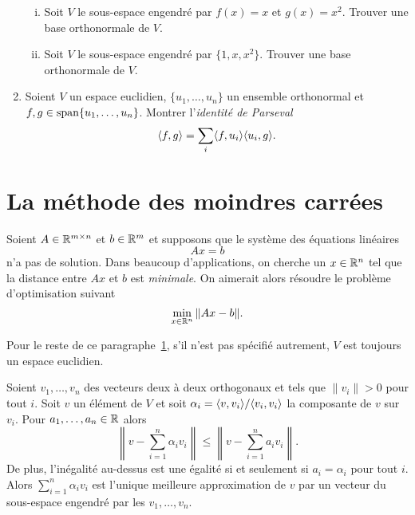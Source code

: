 \begin{enumerate}
\begin{enumerate}[i)]
  \item Soit $V$ le sous-espace engendré par $f(x) = x$ et $g(x) = x^2$. Trouver une base orthonormale de $V$. 
  \item Soit $V$ le sous-espace engendré par $\{1,x,x^2\}$. Trouver une base orthonormale de $V$. 
  \end{enumerate}
\item Soient $V$ un espace euclidien, $\{u_1,\dots,u_n\}$ un ensemble orthonormal et $f,g \in \operatorname{span}\{u_1,\dots,u_n\}$. Montrer l'\emph{identité de Parseval}
  \begin{displaymath}
    \langle {f,g} \rangle = \sum_i \langle {f,u_i} \rangle\langle {u_i,g} \rangle. 
  \end{displaymath}
\end{enumerate}


\section{La méthode des moindres carrées} 
\label{sec:le-methode-des}

Soient $A \in \mathbb{R}^{m \times n} $ et $b \in \mathbb{R}^m$ et supposons  que le système des équations linéaires 
\begin{equation}
  \label{eq:2}
  Ax = b
\end{equation}
n'a pas de solution. Dans beaucoup d'applications, on cherche un $x \in \mathbb{R}^n$ tel que la distance entre  $Ax$ et $b$ est \emph{minimale}. On aimerait alors résoudre le problème d'optimisation suivant
\begin{equation}
  \label{eq:3}
  \min_{x \in \mathbb{R}^n} \|Ax - b\|. 
\end{equation}

\begin{framed}\noindent 
  Pour le reste de ce paragraphe~\ref{sec:le-methode-des}, s'il n'est pas spécifié autrement, $V$ est toujours un espace euclidien.
\end{framed} 


\begin{theorem}
  \label{thr:3}
  Soient $v_1,\dots,v_n$ des vecteurs deux à deux orthogonaux et tels que $\|v_i\|>0$ pour tout $i$. Soit $v$ un élément de $V$ et soit $\alpha_i = \langle {v,v_i} \rangle/\langle {v_i,v_i} \rangle$ la composante de $v$ sur $v_i$. Pour $a_1,\dots,a_n \in \mathbb{R}$ alors 
  \begin{displaymath}
    \left\| v - \sum_{i=1}^n \alpha_iv_i \right\|  \leq \left\| v - \sum_{i=1}^n a_iv_i \right\|.
  \end{displaymath}
De plus, l'inégalité au-dessus est une égalité si et seulement si $a_i = \alpha_i$ pour tout $i$. 
Alors $\sum_{i=1}^n \alpha_iv_i$ est l'unique  meilleure approximation de $v$ par un vecteur du sous-espace engendré par les $v_1,\dots,v_n$. 
\end{theorem}


